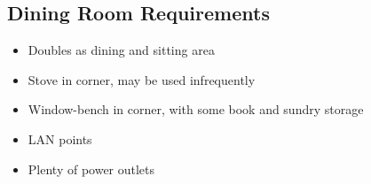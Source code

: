 \subsection{Dining Room Requirements}
\begin{itemize}
\item Doubles as dining and sitting area
\item Stove in corner, may be used infrequently
\item Window-bench in corner, with some book and sundry storage
\item LAN points
\item Plenty of power outlets

\end{itemize}
